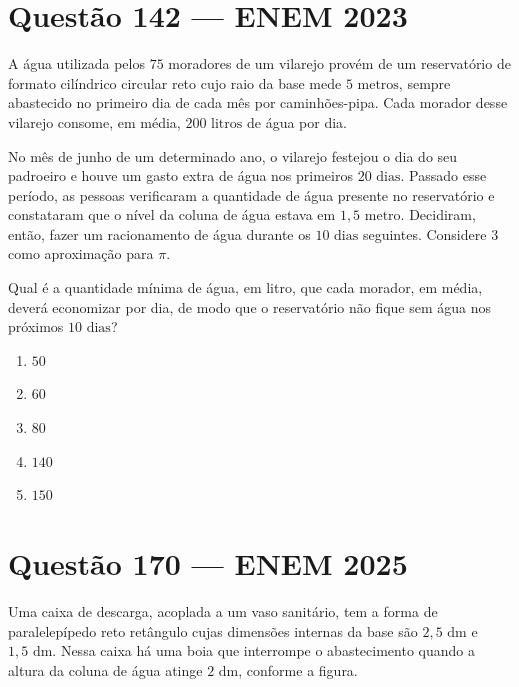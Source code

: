 \documentclass[11pt,a4paper]{article}
\begin{document}
\section*{Questão 142 --- ENEM 2023}

A água utilizada pelos $75$ moradores de um vilarejo provém de um reservatório de formato cilíndrico circular reto cujo raio da base mede $5\text{ metros}$, sempre abastecido no primeiro dia de cada mês por caminhões-pipa. Cada morador desse vilarejo consome, em média, $200\text{ litros}$ de água por dia.

No mês de junho de um determinado ano, o vilarejo festejou o dia do seu padroeiro e houve um gasto extra de água nos primeiros $20\text{ dias}$. Passado esse período, as pessoas verificaram a quantidade de água presente no reservatório e constataram que o nível da coluna de água estava em $1{,}5\text{ metro}$. Decidiram, então, fazer um racionamento de água durante os $10\text{ dias}$ seguintes. Considere $3$ como aproximação para $\pi$.

Qual é a quantidade mínima de água, em litro, que cada morador, em média, deverá economizar por dia, de modo que o reservatório não fique sem água nos próximos $10\text{ dias}$?

\begin{enumerate}[label=(\Alph*)]
    \item $50$
    \item $60$
    \item $80$
    \item $140$
    \item $150$
\end{enumerate}

\section*{Questão 170 --- ENEM 2025}

Uma caixa de descarga, acoplada a um vaso sanitário, tem a forma de paralelepípedo reto retângulo cujas dimensões internas da base são $2{,}5\text{ dm}$ e $1{,}5\text{ dm}$. Nessa caixa há uma boia que interrompe o abastecimento quando a altura da coluna de água atinge $2\text{ dm}$, conforme a figura.
\end{document}
